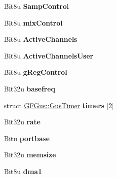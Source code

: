 \begin{DoxyCompactItemize}
\item 
\hypertarget{structGFGus_a7c8531d5c690cd07351c51cd396b6cfd}{Bit8u {\bfseries Samp\-Control}}\label{structGFGus_a7c8531d5c690cd07351c51cd396b6cfd}

\item 
\hypertarget{structGFGus_a426b7aa4b22584a270efc3b9f7dd6fab}{Bit8u {\bfseries mix\-Control}}\label{structGFGus_a426b7aa4b22584a270efc3b9f7dd6fab}

\item 
\hypertarget{structGFGus_ae8d8e079f6f84bb7a8873468eaea97d7}{Bit8u {\bfseries Active\-Channels}}\label{structGFGus_ae8d8e079f6f84bb7a8873468eaea97d7}

\item 
\hypertarget{structGFGus_a37b1ebcbe19c5eb7703d689933158850}{Bit8u {\bfseries Active\-Channels\-User}}\label{structGFGus_a37b1ebcbe19c5eb7703d689933158850}

\item 
\hypertarget{structGFGus_ad696f706f977946e998a072f2618f897}{Bit8u {\bfseries g\-Reg\-Control}}\label{structGFGus_ad696f706f977946e998a072f2618f897}

\item 
\hypertarget{structGFGus_af0844468a58782bb624bd5348aad9fe1}{Bit32u {\bfseries basefreq}}\label{structGFGus_af0844468a58782bb624bd5348aad9fe1}

\item 
\hypertarget{structGFGus_a4126dd0c0afae7f1b4c2c4809028962c}{struct \hyperlink{structGFGus_1_1GusTimer}{G\-F\-Gus\-::\-Gus\-Timer} {\bfseries timers} \mbox{[}2\mbox{]}}\label{structGFGus_a4126dd0c0afae7f1b4c2c4809028962c}

\item 
\hypertarget{structGFGus_ab7c58ef593b76322e9b4ff7a4032886d}{Bit32u {\bfseries rate}}\label{structGFGus_ab7c58ef593b76322e9b4ff7a4032886d}

\item 
\hypertarget{structGFGus_af1524523012bf8b71742d3e5b8a9f45e}{Bitu {\bfseries portbase}}\label{structGFGus_af1524523012bf8b71742d3e5b8a9f45e}

\item 
\hypertarget{structGFGus_aefc3bdb890dc452e3cc8a338822f3953}{Bit32u {\bfseries memsize}}\label{structGFGus_aefc3bdb890dc452e3cc8a338822f3953}

\item 
\hypertarget{structGFGus_a8f85bbf75654bc07c18c99ace603abfa}{Bit8u {\bfseries dma1}}\label{structGFGus_a8f85bbf75654bc07c18c99ace603abfa}


\end{DoxyCompactItemize}

